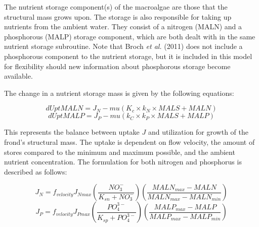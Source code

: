 \documentclass{deltares_manual}
\begin{document}
The nutrient storage component(s) of the macroalgae are those that the structural mass grows upon. The storage is also responsible for taking up nutrients from the ambient water. They consist of a nitrogen (MALN) and a phosphorous (MALP) storage component, which are both dealt with in the same nutrient storage subroutine. Note that Broch \textit{et al.} (2011) does not include a phosphorous component to the nutrient storage, but it is included in this model for flexibility should new information about phosphorous storage become available.

The change in a nutrient storage mass is given by the following equations:

\[dUptMALN = J_N - mu(K_c \times k_N \times MALS + MALN)\]
\[dUptMALP = J_P - mu(k_C \times k_P \times MALS + MALP)\]

This represents the balance between uptake $J$ and utilization for growth of the frond's structural mass. The uptake is dependent on flow velocity, the amount of stores compared to the minimum and maximum possible, and the ambient nutrient concentration. The formulation for both nitrogen and phosphorus is described as follows:

\[J_N = f_{velocity}J_{Nmax}(\frac{NO_3^-}{K_{sn}+NO_3^-})(\frac{MALN_{max}-MALN}{MALN_{max}-MALN_{min}})\]
\[J_P = f_{velocity}J_{Pmax}(\frac{PO_4^{3-}}{K_{sp}+PO_4^{3-}})(\frac{MALP_{max}-MALP}{MALP_{max}-MALP_{min}})\]
\end{document}
